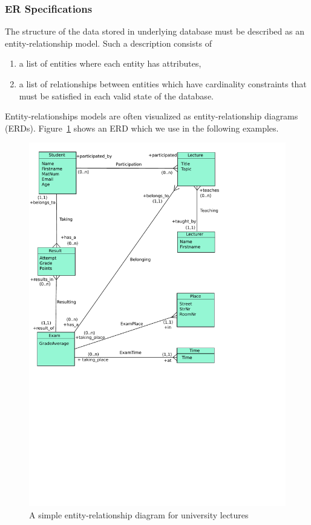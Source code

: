 \subsubsection{ER Specifications}
\label{sec:erd2cdbi}

The structure of the data stored in underlying database
must be described as an entity-relationship model.
Such a description consists of
\begin{enumerate}
\item a list of entities where each entity has attributes,
\item a list of relationships between entities which have
      cardinality constraints that must be satisfied
      in each valid state of the database.
\end{enumerate}
%
Entity-relationships models are often visualized as
entity-relationship diagrams (ERDs).
Figure~\ref{fig:erd} shows an ERD which we use in the following examples.

\begin{figure}[t]
\begin{center}
  \includegraphics[trim= 0 320 120 0,scale=0.7, clip=true]{diagram.pdf}
\end{center}
\caption{A simple entity-relationship diagram for university lectures \cite{HanusKrone17EPTCS}}
\label{fig:erd}
\end{figure}

